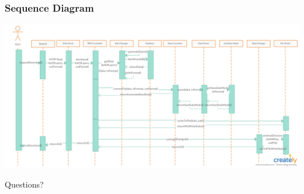 \documentclass[xcolor=table]{beamer}
\begin{document}
\begin{frame}[plain]
	\frametitle{Sequence Diagram}
	\begin{center}
		\hspace*{-12mm}
		\includegraphics[width=\paperwidth]{download_sequence_diagram_v2.png}
	\end{center}
\end{frame}
\begin{frame}
	\Huge{\centerline{Questions?}}
\end{frame}
\end{document}

